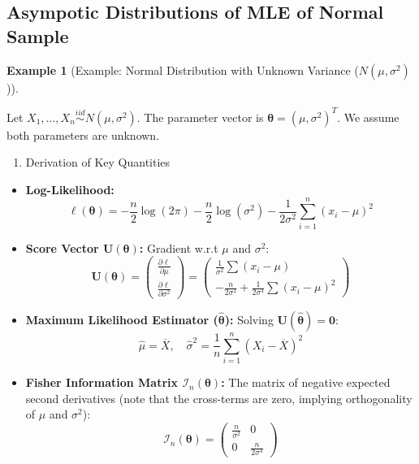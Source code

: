 \documentclass[
  letterpaper,
  DIV=11,
  numbers=noendperiod]{scrreprt}
\providecommand{\tightlist}{%
  \setlength{\itemsep}{0pt}\setlength{\parskip}{0pt}}
\renewcommand{\[}{\begin{equation}}
\renewcommand{\]}{\end{equation}}
\theoremstyle{definition}
\theoremstyle{plain}
\theoremstyle{plain}
\theoremstyle{plain}
\theoremstyle{definition}
\newtheorem{example}{Example}[chapter]
\theoremstyle{plain}
\theoremstyle{remark}
\begin{document}
\subsection{Asympotic Distributions of MLE of Normal
Sample}\label{asympotic-distributions-of-mle-of-normal-sample}

\begin{example}[Example: Normal Distribution with Unknown Variance
(\(N(\mu, \sigma^2)\))]\protect\hypertarget{exm-normal-mle-unknown-variance}{}\label{exm-normal-mle-unknown-variance}

Let \(X_1, \dots, X_n \overset{iid}{\sim} N(\mu, \sigma^2)\). The
parameter vector is \(\boldsymbol{\theta} = (\mu, \sigma^2)^T\). We
assume both parameters are unknown.

\begin{enumerate}
\def\labelenumi{\arabic{enumi}.}
\tightlist
\item
  Derivation of Key Quantities
\end{enumerate}

\begin{itemize}
\item
  \textbf{Log-Likelihood:} \[
    \ell(\boldsymbol{\theta}) = -\frac{n}{2}\log(2\pi) - \frac{n}{2}\log(\sigma^2) - \frac{1}{2\sigma^2}\sum_{i=1}^n (x_i - \mu)^2
    \]
\item
  \textbf{Score Vector \(\mathbf{U}(\boldsymbol{\theta})\):} Gradient
  w.r.t \(\mu\) and \(\sigma^2\): \[
    \mathbf{U}(\boldsymbol{\theta}) = \begin{pmatrix} \frac{\partial \ell}{\partial \mu} \\ \frac{\partial \ell}{\partial \sigma^2} \end{pmatrix} = \begin{pmatrix} \frac{1}{\sigma^2}\sum (x_i - \mu) \\ -\frac{n}{2\sigma^2} + \frac{1}{2\sigma^4}\sum (x_i - \mu)^2 \end{pmatrix}
    \]
\item
  \textbf{Maximum Likelihood Estimator (\(\hat{\boldsymbol{\theta}}\)):}
  Solving \(\mathbf{U}(\hat{\boldsymbol{\theta}}) = \mathbf{0}\): \[
    \hat{\mu} = \overline{X}, \quad \hat{\sigma}^2 = \frac{1}{n}\sum_{i=1}^n (X_i - \overline{X})^2
    \]
\item
  \textbf{Fisher Information Matrix
  \(\mathcal{I}_n(\boldsymbol{\theta})\):} The matrix of negative
  expected second derivatives (note that the cross-terms are zero,
  implying orthogonality of \(\mu\) and \(\sigma^2\)): \[
    \mathcal{I}_n(\boldsymbol{\theta}) = \begin{pmatrix} \frac{n}{\sigma^2} & 0 \\ 0 & \frac{n}{2\sigma^4} \end{pmatrix}
    \]
\end{itemize}


\end{example}
\end{document}
